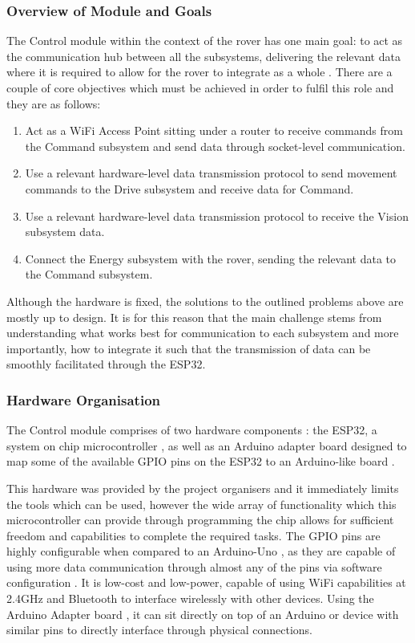 \documentclass[a4paper]{article}
\begin{document}
\subsubsection{Overview of Module and Goals}
The Control module within the context of the rover has one main goal: 
to act as the communication hub between all the subsystems, delivering
the relevant data where it is required to allow for the rover to integrate
as a whole \cite{MarsRoverSpec}. There are a couple of core objectives which must be 
achieved in order to fulfil this role and they are as follows:

\begin{enumerate}
    \item Act as a WiFi Access Point sitting under a router to receive
    commands from the Command subsystem and send data through socket-level communication.
    \item Use a relevant hardware-level data transmission protocol to
    send movement commands to the Drive subsystem and receive data for Command. 
    \item Use a relevant hardware-level data transmission protocol to receive
    the Vision subsystem data.
    \item Connect the Energy subsystem with the rover, sending the relevant data
    to the Command subsystem.
\end{enumerate}

Although the hardware is fixed, the solutions to the outlined problems
above are mostly up to design. It is for this reason that the main challenge
stems from understanding what works best for communication to each subsystem
and more importantly, how to integrate it such that the transmission of data
can be smoothly facilitated through the ESP32.

\subsubsection{Hardware Organisation}

The Control module comprises of two hardware components \cite{BoxContent}: 
the ESP32, a system on chip microcontroller \cite{ESP32Datasheet}, as well as an Arduino adapter
board designed to map some of the available GPIO pins on the ESP32 to an Arduino-like
board \cite{ESP32ArduinoAdapter}.

This hardware was provided by the project organisers and it immediately limits
the tools which can be used, however the wide array of functionality which
this microcontroller can provide through programming the chip allows
for sufficient freedom and capabilities to complete the required tasks. The
GPIO pins are highly configurable when compared to an Arduino-Uno \cite{MicrocontrollerComparison}, as they
are capable of using more data communication through almost any of the pins
via software configuration \cite{ESP32PinOut}. It is low-cost and low-power, 
capable of using WiFi capabilities at 2.4GHz and Bluetooth \cite{ESP32Datasheet} to interface wirelessly
with other devices. Using the Arduino Adapter board \cite{ESP32ArduinoAdapter}, it can sit directly on top of
an Arduino or device with similar pins to directly interface through physical connections. 
\end{document}
